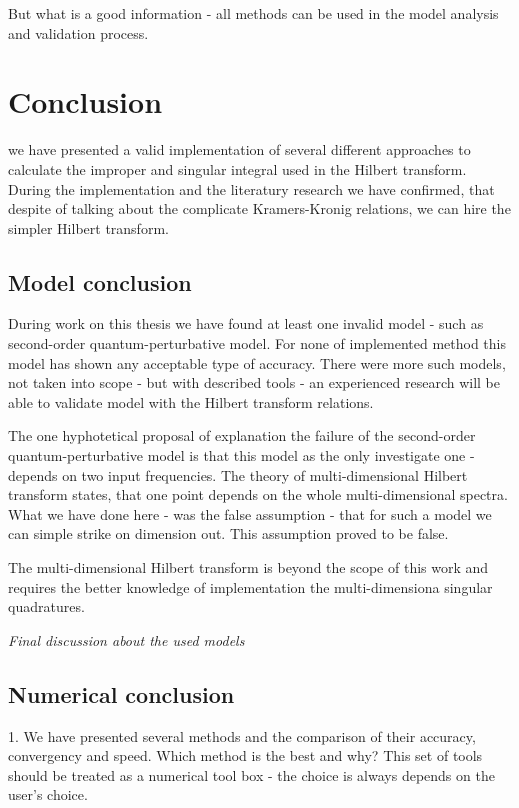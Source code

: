 \documentclass[12pt,twoside,a4paper]{article}
\numberwithin{equation}{subsection}
\numberwithin{figure}{subsection}
\begin{document}
But what is a good information - all methods can be used in the model analysis and validation process.

\section{Conclusion} \label{chap:conclusion}

we have presented a valid implementation of several different approaches to calculate the improper and singular integral used in
the Hilbert transform. During the implementation and the literatury research we have confirmed, that despite of talking about the
complicate Kramers-Kronig relations, we can hire the simpler Hilbert transform.

\subsection{Model conclusion} \label{chap:conclusion_model}


During work on this thesis we have found at least one invalid model - such as second-order quantum-perturbative model. For none of
implemented method this model has shown any acceptable type of accuracy. There were more such models, not taken into scope - but
with described tools - an experienced research will be able to validate model with the Hilbert transform relations.

The one hyphotetical proposal of explanation the failure of the second-order quantum-perturbative model is that this model as the
only investigate one - depends on two input frequencies. The theory of multi-dimensional Hilbert transform states, that one point
depends on the whole multi-dimensional spectra. What we have done here - was the false assumption - that for such a model we can
simple strike on dimension out. This assumption proved to be false. 

The multi-dimensional Hilbert transform is beyond the scope of this work and requires the better knowledge of implementation the
multi-dimensiona singular quadratures.


\textit{Final discussion about the used models}

\subsection{Numerical conclusion} \label{chap:conclusion_numerical}


1. We have presented several methods and the comparison of their accuracy, convergency and speed. Which method is the best and why?
This set of tools should be treated as a numerical tool box - the choice is always depends on the user's choice.
\end{document}
